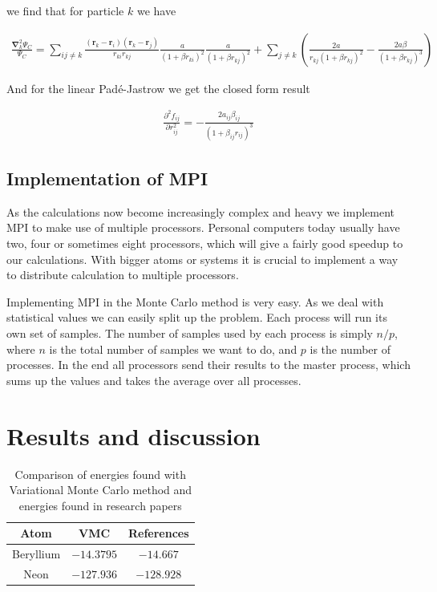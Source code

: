 \documentclass[11pt]{article}
\begin{document}
			we find that for particle $k$ we have

			\begin{align}
				\frac{\mathbf{\nabla}_{k}^{2}\Psi_{C}}{\Psi_{C}}=\sum_{ij\ne k}\frac{(\mathbf{r}_{k}-\mathbf{r}_{i})(\mathbf{r}_{k}-\mathbf{r}_{j})}{r_{ki}r_{kj}}\frac{a}{(1+\beta r_{ki})^{2}}\frac{a}{(1+\beta r_{kj})^{2}}+\sum_{j\ne k}\left(\frac{2a}{r_{kj}(1+\beta r_{kj})^{2}}-\frac{2a\beta}{(1+\beta r_{kj})^{3}}\right)
			\end{align}

			And for the linear Padé-Jastrow we get the closed form result

			\begin{align}
				\frac{\partial^{2}f_{ij}}{\partial r_{ij}^{2}}=-\frac{2a_{ij}\beta_{ij}}{\left(1+\beta_{ij}r_{ij}\right)^{3}}
			\end{align}

	\subsection{Implementation of MPI}
		As the calculations now become increasingly complex and heavy we implement MPI to make use of multiple processors. Personal computers today usually have two, four or sometimes eight processors, which will give a fairly good speedup to our calculations. With bigger atoms or systems it is crucial to implement a way to distribute calculation to multiple processors.

		Implementing MPI in the Monte Carlo method is very easy. As we deal with statistical values we can easily split up the problem. Each process will run its own set of samples. The number of samples used by each process is simply $n/p$, where $n$ is the total number of samples we want to do, and $p$ is the number of processes. In the end all processors send their results to the master process, which sums up the values and takes the average over all processes.

\section{Results and discussion}

	\begin{table}

		\center
			\begin{tabular}{|c|c|c|}
			    \hline
			   	Atom & VMC & References
			    \\ \hline
			    Beryllium & $-14.3795$ & $-14.667$
			    \\ \hline
			    Neon & $-127.936$ &  \(-128.928\)
			    \\	\hline
		  \end{tabular}
		  \caption{Comparison of energies found with Variational Monte Carlo method and
		energies found in research papers \cite{Koput:2011:PCCP} \cite{QUA:QUA560090204} }
		\label{tab:energyReference}
	\end{table}
\end{document}

